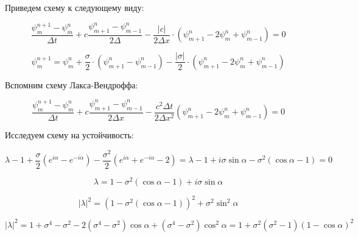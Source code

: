 \documentclass[10pt,a4paper]{article}
\begin{document}
	Приведем схему к следующему виду:
	
	\begin{equation}
		\frac{\psi_{m}^{n + 1} - \psi_{m}^{n}}{\Delta t} + c\frac{ 
		\psi_{m + 1}^{n} - \psi_{m - 1}^{n}}{2\Delta} - \frac{\left|c\right|}
		{2\Delta x}\cdot\left(\psi_{m + 1}^{n} - 2\psi_{m}^{n} + 
		\psi_{m - 1}^{n}\right) = 0
	\end{equation}
	
	\begin{equation}
		\psi_{m}^{n + 1} = \psi_{m}^{n} + \frac{\sigma}{2}\cdot\left(
		\psi_{m + 1}^{n} - \psi_{m - 1}^{n}\right) - 
		\frac{\left|\sigma\right|}{2}\cdot\left(\psi_{m + 1}^{n} - 2\psi_{m}^{n}
		+ \psi_{m - 1}^{n}\right)
	\end{equation}
	
	Вспомним схему Лакса-Вендроффа:
	
	\begin{equation}
		\frac{\psi^{n + 1}_{m} - \psi^{n}_{m}}{\Delta t} + c\frac{
		\psi^{n}_{m + 1} - \psi^{n}_{m- 1}}{2\Delta x} - 
		\frac{c^{2}\Delta t}{2\Delta x^{2}}\left(
		\psi^{n}_{m + 1} - 2\psi^{n}_{m} + \psi^{n}_{m - 1}\right) = 0
	\end{equation}
	
	Исследуем схему на устойчивость:
	
	\begin{equation}
		\lambda - 1 + \frac{\sigma}{2}\left(e^{i\alpha} - e^{-i\alpha}\right) - 
		\frac{\sigma^{2}}{2}\left(e^{i\alpha} + e^{-i\alpha} - 2\right) = 
		\lambda - 1 + i\sigma\sin\alpha - \sigma^{2}\left(\cos\alpha - 1\right)
		= 0
	\end{equation}
	
	\begin{equation}
		\lambda = 1 - \sigma^{2}\left(\cos\alpha - 1\right) + i\sigma\sin\alpha
	\end{equation}
	
	\begin{equation}
		\left|\lambda\right|^{2} = \left(1 - \sigma^{2}\left(\cos\alpha - 
		1\right)\right)^{2} + \sigma^{2}\sin^{2}\alpha
	\end{equation}
	
	\begin{equation}
		\left|\lambda\right|^{2} = 1 + \sigma^{4} - \sigma^{2} - 2\left(
		\sigma^{4} - \sigma^{2}\right)\cos\alpha + \left(\sigma^{4} - 
		\sigma^{2}\right)\cos^{2}\alpha = 1 + \sigma^{2}\left(\sigma^{2} - 
		1\right)\left(1 - \cos\alpha\right)^{2}
	\end{equation}
	
\end{document}
